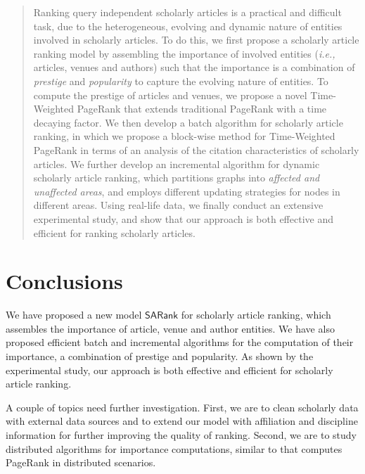\documentclass[10pt,conference,letterpaper]{IEEEtran}
\newcounter{prop}
\newcounter{fact}
\newcounter{alg}[section]
\newcommand{\ie}{\emph{i.e.,}\xspace}
\newcommand{\kw}[1]{{\ensuremath {\mathsf{#1}}}\xspace}
\newcommand{\ensemblerank}{\kw{SARank}}
\begin{document}
\begin{abstract}
Ranking query independent scholarly articles is a
practical and difficult task, due to the
heterogeneous, evolving and dynamic nature of entities involved in scholarly articles.
To do this, we first propose a scholarly article ranking model by assembling the importance of involved entities (\ie articles, venues and authors) such that the importance is a combination of {\em prestige} and {\em popularity} to capture the evolving nature of entities.
To compute the prestige of articles and venues, we propose a novel Time-Weighted PageRank that extends traditional PageRank with a time decaying factor. %
We then develop a batch algorithm for scholarly article ranking, in which we propose a block-wise method for Time-Weighted PageRank in terms of an analysis of the citation characteristics of scholarly articles.
We further develop  an incremental algorithm for dynamic scholarly article ranking, which partitions graphs into {\em affected and unaffected areas}, and employs different updating strategies for nodes in different areas. Using real-life data, we finally conduct an extensive experimental study, and show that our approach is both effective and efficient for ranking scholarly articles.
\end{abstract}










\balance
\section{Conclusions}
\label{sec-conc}
We have proposed a new model \ensemblerank for scholarly article ranking,
which assembles the importance of article, venue and author entities.
We have also proposed efficient batch and incremental algorithms for the computation of their importance, a combination of prestige and popularity.
As shown by the experimental study, our approach is both effective and efficient for scholarly article ranking.


A couple of topics need further investigation. First, we are to clean scholarly data with external data sources
and to extend our model with affiliation and discipline information for further improving the quality of ranking.
Second, we are to study distributed algorithms for importance computations, similar to \cite{ZhuYL05} that computes PageRank in distributed scenarios.
\end{document}

